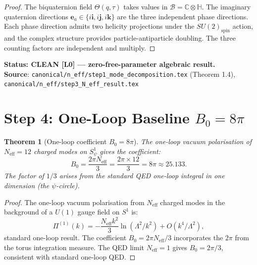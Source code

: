 \documentclass[12pt,a4paper]{article}
\newtheorem{theorem}{Theorem}[section]
\theoremstyle{definition}
\theoremstyle{remark}
\begin{document}
\begin{proof}
The biquaternion field $\Theta(q,\tau)$ takes values in $\mathcal{B} = \mathbb{C}\otimes\mathbb{H}$.
The imaginary quaternion directions $\mathbf{e}_a\in\{i\mathbf{i}, i\mathbf{j}, i\mathbf{k}\}$
are the three independent phase directions.  Each phase direction admits two helicity
projections under the $SU(2)_{\mathrm{spin}}$ action, and the complex structure provides
particle-antiparticle doubling.  The three counting factors are independent and multiply.
\end{proof}

\begin{resultbox}
\textbf{Status: CLEAN [L0] — zero-free-parameter algebraic result.}\\
\textbf{Source}: \texttt{canonical/n\_eff/step1\_mode\_decomposition.tex} (Theorem 1.4),\\
\texttt{canonical/n\_eff/step3\_N\_eff\_result.tex}
\end{resultbox}

\section{Step 4: One-Loop Baseline $B_0 = 8\pi$}
\label{sec:bc:B0}

\begin{theorem}[One-loop coefficient $B_0 = 8\pi$]
\label{thm:bc:B0}
The one-loop vacuum polarisation of $N_{\mathrm{eff}} = 12$ charged modes on
$S^1_\psi$ gives the coefficient:
\begin{equation}
  B_0 = \frac{2\pi N_{\mathrm{eff}}}{3} = \frac{2\pi \times 12}{3} = 8\pi \approx 25.133.
  \label{eq:bc:B0}
\end{equation}
The factor of $1/3$ arises from the standard QED one-loop integral in one dimension
(the $\psi$-circle).
\end{theorem}

\begin{proof}
The one-loop vacuum polarisation from $N_{\mathrm{eff}}$ charged modes in the
background of a $U(1)$ gauge field on $S^1$ is:
\begin{equation}
  \Pi^{(1)}(k) = -\frac{N_{\mathrm{eff}} k^2}{3} \ln(\Lambda^2/k^2) + O(k^4/\Lambda^2),
  \label{eq:bc:Pi1}
\end{equation}
standard one-loop result.  The coefficient $B_0 = 2\pi N_{\mathrm{eff}}/3$
incorporates the $2\pi$ from the torus integration measure.
The QED limit $N_{\mathrm{eff}} = 1$ gives $B_0 = 2\pi/3$, consistent with
standard one-loop QED.
\end{proof}
\end{document}
